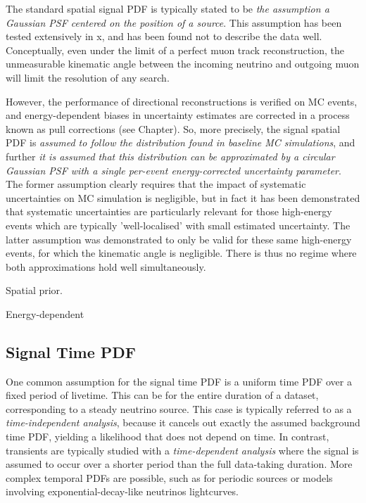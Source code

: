 The standard spatial signal PDF is typically stated to be \emph{the assumption a Gaussian PSF centered on the position of a source}. This assumption has been tested extensively in x, and has been found not to describe the data well. Conceptually, even under the limit of a perfect muon track reconstruction, the unmeasurable kinematic angle between the incoming neutrino and outgoing muon will limit the resolution of any search.

However, the performance of directional reconstructions is verified on MC events, and energy-dependent biases in uncertainty estimates are corrected in a process known as pull corrections (see Chapter). So, more precisely, the signal spatial PDF is \emph{assumed to follow the distribution found in baseline MC simulations}, and further \emph{it is assumed that this distribution can be approximated by a circular Gaussian PSF with a single per-event energy-corrected uncertainty parameter}. The former assumption clearly requires that the impact of systematic uncertainties on MC simulation is negligible, but in fact it has been demonstrated that systematic uncertainties are particularly relevant for those high-energy events which are typically 'well-localised' with small estimated uncertainty. The latter assumption was demonstrated to only be valid for these same high-energy events, for which the kinematic angle is negligible. There is thus no regime where both approximations hold well simultaneously.

Spatial prior.

Energy-dependent

\subsection{Signal Time PDF}

One common assumption for the signal time PDF is a uniform time PDF over a fixed period of livetime. This can be for the entire duration of a dataset, corresponding to a steady neutrino source. This case is typically referred to as a \emph{time-independent analysis}, because it cancels out exactly the assumed background time PDF, yielding a likelihood that does not depend on time. In contrast, transients are typically studied with a \emph{time-dependent analysis} where the signal is assumed to occur over a shorter period than the full data-taking duration. More complex temporal PDFs are possible, such as for periodic sources or models involving exponential-decay-like neutrinos lightcurves.

